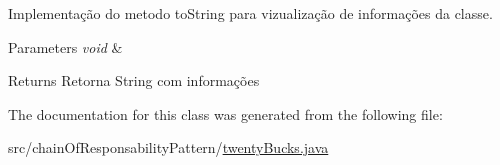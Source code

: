 Implementação do metodo to\+String para vizualização de informações da classe. 


\begin{DoxyParams}{Parameters}
{\em void} & \\
\hline
\end{DoxyParams}
\begin{DoxyReturn}{Returns}
Retorna String com informações 
\end{DoxyReturn}


The documentation for this class was generated from the following file\+:\begin{DoxyCompactItemize}
\item 
src/chain\+Of\+Responsability\+Pattern/\mbox{\hyperlink{twenty_bucks_8java}{twenty\+Bucks.\+java}}\end{DoxyCompactItemize}
